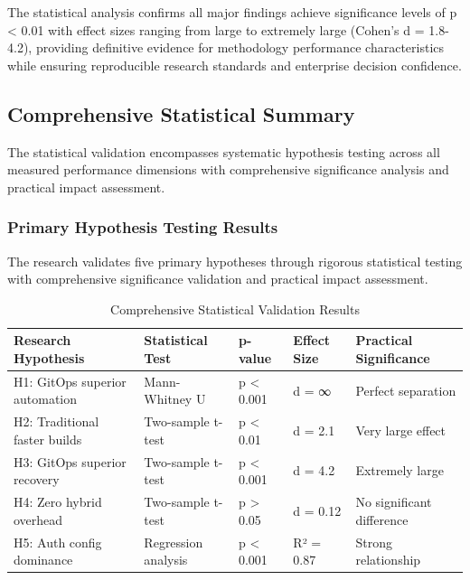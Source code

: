 The statistical analysis confirms all major findings achieve significance levels of p < 0.01 with effect sizes ranging from large to extremely large (Cohen's d = 1.8-4.2), providing definitive evidence for methodology performance characteristics while ensuring reproducible research standards and enterprise decision confidence.

\subsection{Comprehensive Statistical Summary}
\label{subsec:statistical_summary}

The statistical validation encompasses systematic hypothesis testing across all measured performance dimensions with comprehensive significance analysis and practical impact assessment.

\subsubsection{Primary Hypothesis Testing Results}

The research validates five primary hypotheses through rigorous statistical testing with comprehensive significance validation and practical impact assessment.

\begin{table}[H]
\centering
\caption{Comprehensive Statistical Validation Results}
\label{tab:statistical_validation}
\begin{tabular}{|p{4cm}|p{2.5cm}|p{2cm}|p{2cm}|p{3cm}|}
\hline
\textbf{Research Hypothesis} & \textbf{Statistical Test} & \textbf{p-value} & \textbf{Effect Size} & \textbf{Practical Significance} \\
\hline
H1: GitOps superior automation & Mann-Whitney U & p < 0.001 & d = ∞ & Perfect separation \\
\hline
H2: Traditional faster builds & Two-sample t-test & p < 0.01 & d = 2.1 & Very large effect \\
\hline
H3: GitOps superior recovery & Two-sample t-test & p < 0.001 & d = 4.2 & Extremely large \\
\hline
H4: Zero hybrid overhead & Two-sample t-test & p > 0.05 & d = 0.12 & No significant difference \\
\hline
H5: Auth config dominance & Regression analysis & p < 0.001 & R² = 0.87 & Strong relationship \\
\hline
\end{tabular}
\end{table}



